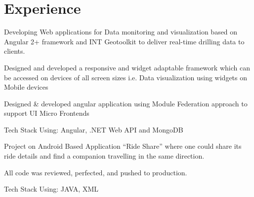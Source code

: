 \documentclass[letterpaper]{deedy-resume} %
\begin{document}
\begin{minipage}[t]{0.66\textwidth} %


\section{Experience}


\vspace{\topsep} %
\begin{tightitemize}
 \item Developing Web applications for Data monitoring and visualization based on Angular	2+ framework and INT Geotoolkit to deliver real-time drilling data to clients.
 \item Designed and developed a responsive and widget adaptable framework which can be accessed on devices of all screen sizes i.e. Data visualization using widgets on Mobile devices
 \item Designed \& developed angular application using Module Federation approach to support UI Micro Frontends
 \item Tech Stack Using: Angular, .NET Web API and MongoDB
\end{tightitemize}

\sectionspace %



\begin{tightitemize}
 \item Project on Android Based Application “Ride Share” where one could share its ride details and find a companion travelling in the same direction.
 \item All code was reviewed, perfected, and pushed to production.
 \item Tech Stack Using: JAVA, XML
\end{tightitemize}

\sectionspace %


\end{minipage}
\end{document}
